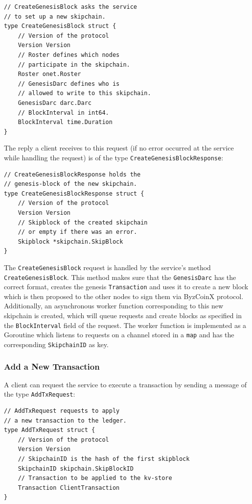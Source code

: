 \documentclass[11pt, a4paper, twoside, openright]{article} %
\begin{document}
\begin{lstlisting}[caption={The structure of the \texttt{CreateGenesisBlock} message.},captionpos=b]
// CreateGenesisBlock asks the service
// to set up a new skipchain.
type CreateGenesisBlock struct {
	// Version of the protocol
	Version Version
	// Roster defines which nodes
    // participate in the skipchain.
	Roster onet.Roster
	// GenesisDarc defines who is
    // allowed to write to this skipchain.
	GenesisDarc darc.Darc
	// BlockInterval in int64.
	BlockInterval time.Duration
}
\end{lstlisting}

\newpage
The reply a client receives to this request (if no error occurred at the
service while handling the request)
is of the type \texttt{CreateGenesisBlockResponse}:

\begin{lstlisting}[caption={The structure of the \texttt{CreateGenesisBlockResponse} message.},captionpos=b]
// CreateGenesisBlockResponse holds the
// genesis-block of the new skipchain.
type CreateGenesisBlockResponse struct {
	// Version of the protocol
	Version Version
	// Skipblock of the created skipchain
    // or empty if there was an error.
	Skipblock *skipchain.SkipBlock
}
\end{lstlisting}

The \texttt{CreateGenesisBlock} request is handled by the service's
method \texttt{CreateGenesisBlock}. This method makes sure that the
\texttt{GenesisDarc} has the correct format, creates the genesis
\texttt{Transaction} and uses it to create a new block which is then proposed
to the other nodes to sign them via ByzCoinX protocol.
Additionally, an asynchronous worker function corresponding to this
new skipchain is created, which will queue requests
and create blocks as specified in the \texttt{BlockInterval} field of the
request.
The worker function is implemented as a Goroutine which listens to requests
on a channel stored in a \texttt{map} and has the corresponding
\texttt{SkipchainID} as key.\\

\subsubsection{Add a New Transaction}
A client can request the service to execute a transaction by sending a message
of the type \texttt{AddTxRequest}:

\begin{lstlisting}[caption={The structure of the \texttt{AddTxRequest} message.},captionpos=b]
// AddTxRequest requests to apply
// a new transaction to the ledger.
type AddTxRequest struct {
	// Version of the protocol
	Version Version
	// SkipchainID is the hash of the first skipblock
	SkipchainID skipchain.SkipBlockID
	// Transaction to be applied to the kv-store
	Transaction ClientTransaction
}
\end{lstlisting}
\end{document}
